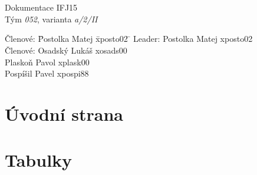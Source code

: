 \documentclass[a4paper, 12pt]{article}
\begin{document}
\begin{titlepage}

\begin{center}
\fontsize{25}{20}\\
\fontsize{21}{0}\textsc{\selectfont{Fakulta informačních technologií}}\\
\LARGE{Dokumentace IFJ15}\\
\Large{Tým \textit{052}, varianta \textit{a/2/II}}
\end{center}

\begin{large}
\begin{tabbing}
    Členové: \= Postolka Matej \quad \= xposto02 \= \kill
    Leader:  \> Postolka Matej \> xposto02\\
    Členové: \> Osadský Lukáš  \> xosads00\\
             \> Plaskoň Pavol  \> xplask00\\
             \> Pospíšil Pavel \> xpospi88\\
\end{tabbing}
\end{large}

\end{titlepage}

\tableofcontents
\newpage
\section{Úvodní strana}

\section{Tabulky}
\end{document}
